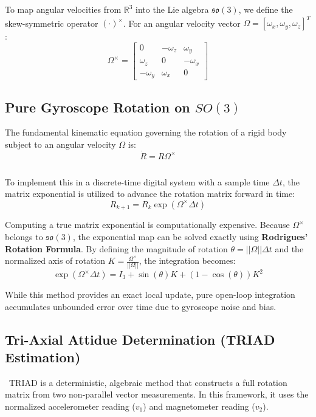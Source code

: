 \documentclass{article}
\begin{document}
To map angular velocities from $\mathbb{R}^3$ into the Lie algebra $\mathfrak{so}(3)$, we define the skew-symmetric operator $(\cdot)^\times$. For an angular velocity vector $\Omega = [\omega_x, \omega_y, \omega_z]^T$:
\begin{equation}
   \Omega^\times = \begin{bmatrix} 0 & -\omega_z & \omega_y \\ \omega_z & 0 & -\omega_x \\ -\omega_y & \omega_x & 0 \end{bmatrix}
\end{equation}

\subsection{Pure Gyroscope Rotation on $SO(3)$}

The fundamental kinematic equation governing the rotation of a rigid body subject to an angular velocity $\Omega$ is:
\begin{equation}
    \dot{R} = R \Omega^\times
\end{equation}

\[
\]

To implement this in a discrete-time digital system with a sample time $\Delta t$, the matrix exponential is utilized to advance the rotation matrix forward in time:
\[
R_{k+1} = R_k \exp(\Omega^\times \Delta t)
\]

Computing a true matrix exponential is computationally expensive. Because $\Omega^\times$ belongs to $\mathfrak{so}(3)$, the exponential map can be solved exactly using \textbf{Rodrigues' Rotation Formula}. By defining the magnitude of rotation $\theta = ||\Omega||\Delta t$ and the normalized axis of rotation $K = \frac{\Omega^\times}{||\Omega||}$, the integration becomes:
\[
\exp(\Omega^\times \Delta t) = I_3 + \sin(\theta)K + (1 - \cos(\theta))K^2
\]

While this method provides an exact local update, pure open-loop integration accumulates unbounded error over time due to gyroscope noise and bias.

\subsection{Tri-Axial Attidue Determination (TRIAD Estimation)}
\
TRIAD is a deterministic, algebraic method that constructs a full rotation matrix from two non-parallel vector measurements. In this framework, it uses the normalized accelerometer reading ($v_1$) and magnetometer reading ($v_2$). 
\end{document}
